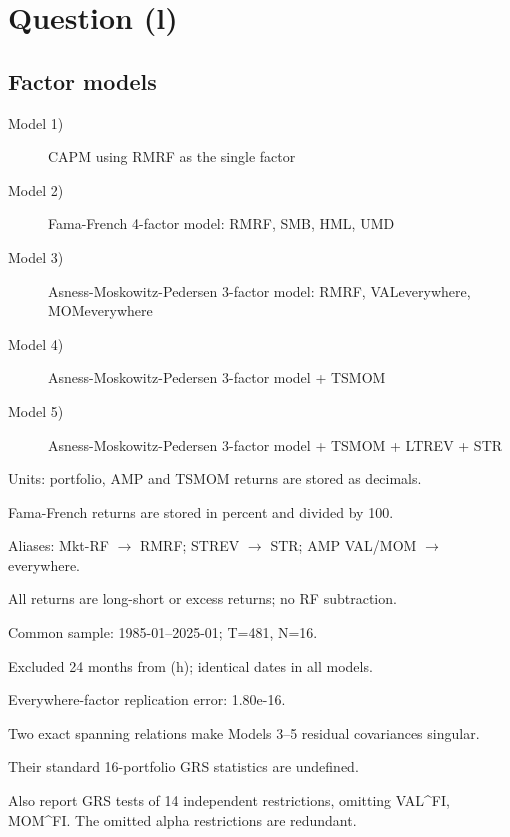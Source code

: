 \documentclass[11pt,letterpaper]{article}
\begin{document}
\FloatBarrier

\clearpage
\section*{Question (l)}

\subsection*{Factor models}

\begin{description}
\item[Model 1)] CAPM using RMRF as the single factor
\item[Model 2)] Fama-French 4-factor model: RMRF, SMB, HML, UMD
\item[Model 3)] Asness-Moskowitz-Pedersen 3-factor model: RMRF, VALeverywhere, MOMeverywhere
\item[Model 4)] Asness-Moskowitz-Pedersen 3-factor model + TSMOM
\item[Model 5)] Asness-Moskowitz-Pedersen 3-factor model + TSMOM + LTREV + STR
\end{description}

Units: portfolio, AMP and TSMOM returns are stored as decimals.

Fama-French returns are stored in percent and divided by 100.

Aliases: Mkt-RF \ensuremath{\rightarrow} RMRF; STREV \ensuremath{\rightarrow} STR; AMP VAL/MOM \ensuremath{\rightarrow} everywhere.

All returns are long-short or excess returns; no RF subtraction.

Common sample: 1985-01--2025-01; T=481, N=16.

Excluded 24 months from (h); identical dates in all models.


Everywhere-factor replication error: 1.80e-16.

Two exact spanning relations make Models 3--5 residual covariances singular.

Their standard 16-portfolio GRS statistics are undefined.

Also report GRS tests of 14 independent restrictions, omitting VAL\^{}FI, MOM\^{}FI. The omitted alpha restrictions are redundant.
\end{document}
